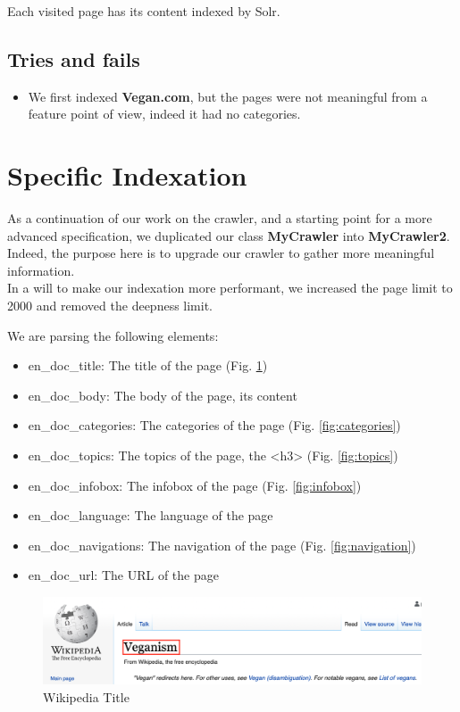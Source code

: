 \documentclass[a4paper]{article}
\begin{document}
Each visited page has its content indexed by Solr.

\subsection{Tries and fails}
\begin{itemize}  
\item We first indexed \textbf{Vegan.com}, but the pages were not meaningful from a feature point of view, indeed it had no categories.
\end{itemize}

\section{Specific Indexation}
As a continuation of our work on the crawler, and a starting point for a more advanced specification, we duplicated our class \textbf{MyCrawler} into \textbf{MyCrawler2}. Indeed, the purpose here is to upgrade our crawler to gather more meaningful information.\\

In a will to make our indexation more performant, we increased the page limit to 2000 and removed the deepness limit.

We are parsing the following elements:
\begin{itemize}
\item en\_doc\_title: The title of the page (Fig. \ref{fig:title})
\item en\_doc\_body: The body of the page, its content
\item en\_doc\_categories: The categories of the page (Fig. \ref{fig:categories})
\item en\_doc\_topics: The topics of the page, the <h3> (Fig. \ref{fig:topics})
\item en\_doc\_infobox: The infobox of the page (Fig. \ref{fig:infobox})
\item en\_doc\_language: The language of the page
\item en\_doc\_navigations: The navigation of the page (Fig. \ref{fig:navigation})
\item en\_doc\_url: The URL of the page
\end{itemize}


\begin{figure}[H]
	\includegraphics[width=\linewidth]{imgs/title}
	\caption{Wikipedia Title}
	\label{fig:title}
\end{figure}
\end{document}
